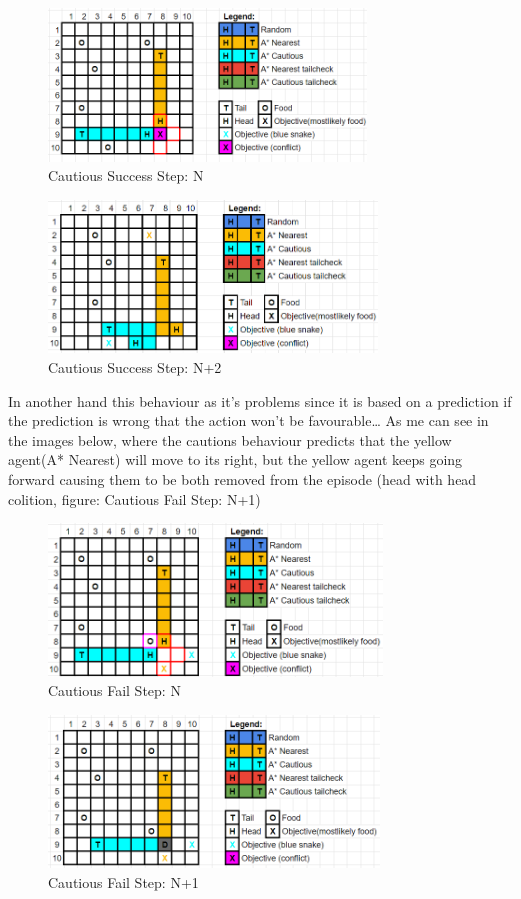 \begin{figure}
\includegraphics[height=1.6in]{A1}
\caption{Cautious Success Step: N}
\end{figure}

\begin{figure}
\includegraphics[height=1.6in]{A2}
\caption{Cautious Success  Step: N+2}
\end{figure}

In another hand this behaviour as it's problems since it is based on a prediction if the prediction is wrong that the action won't be favourable\dots
As me can see in the images below, where the cautions behaviour predicts that the yellow agent(A* Nearest) will move to its right, but the yellow agent keeps going forward causing them to be both removed from the episode (head with head colition, figure: Cautious Fail Step: N+1)

\begin{figure}
\includegraphics[height=1.6in]{B1}
\caption{Cautious Fail Step: N}
\end{figure}

\begin{figure}
\includegraphics[height=1.6in]{B2}
\caption{Cautious Fail Step: N+1}
\end{figure}

